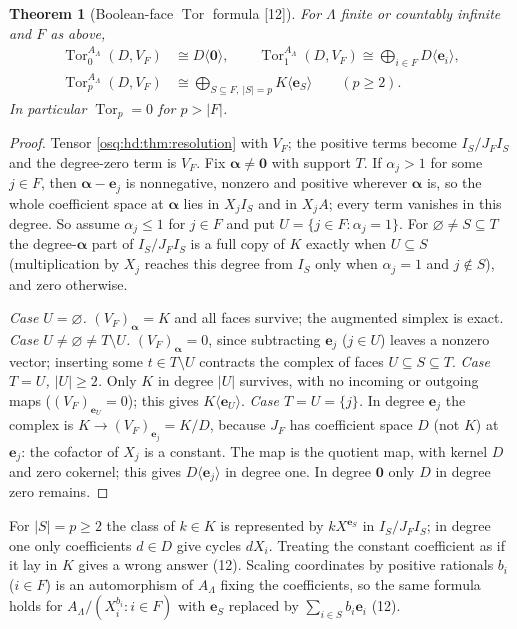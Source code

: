 \documentclass[11pt,letterpaper]{article}
\numberwithin{equation}{section}
\newtheorem{theorem}{Theorem}[section]
\theoremstyle{definition}
\theoremstyle{remark}
\theoremstyle{plain}
\newcommand{\Tor}{\operatorname{Tor}}
\newcommand{\src}[1]{\textup{\textsf{[#1]}}}
\begin{document}
\begin{theorem}[Boolean-face $\Tor$ formula \src{12}]\label{osq:hd:thm:boolean}
For $\Lambda$ finite or countably infinite and $F$ as above,
\begin{align*}
 \Tor_0^{A_\Lambda}(D,V_F)&\cong D\langle\mathbf 0\rangle,\qquad
 \Tor_1^{A_\Lambda}(D,V_F)\cong\bigoplus_{i\in F}D\langle\mathbf e_i\rangle,\\
 \Tor_p^{A_\Lambda}(D,V_F)&\cong\bigoplus_{S\subseteq F,\ |S|=p}K\langle\mathbf e_S\rangle\qquad(p\ge2).
\end{align*}
In particular $\Tor_p=0$ for $p>|F|$.
\end{theorem}
\begin{proof}
Tensor \cref{osq:hd:thm:resolution} with $V_F$; the positive terms become $I_S/J_FI_S$ and the degree-zero term is $V_F$.
Fix $\boldsymbol\alpha\ne\mathbf 0$ with support $T$. If $\alpha_j>1$ for some $j\in F$, then $\boldsymbol\alpha-\mathbf e_j$
is nonnegative, nonzero and positive wherever $\boldsymbol\alpha$ is, so the whole coefficient space at
$\boldsymbol\alpha$ lies in $X_jI_S$ and in $X_jA$; every term vanishes in this degree. So assume $\alpha_j\le1$ for $j\in F$
and put $U=\{j\in F:\alpha_j=1\}$. For $\varnothing\ne S\subseteq T$ the degree-$\boldsymbol\alpha$ part of $I_S/J_FI_S$ is
a full copy of $K$ exactly when $U\subseteq S$ (multiplication by $X_j$ reaches this degree from $I_S$ only when
$\alpha_j=1$ and $j\notin S$), and zero otherwise.

\emph{Case $U=\varnothing$.} $(V_F)_{\boldsymbol\alpha}=K$ and all faces survive; the augmented simplex is exact.
\emph{Case $U\ne\varnothing\ne T\setminus U$.} $(V_F)_{\boldsymbol\alpha}=0$, since subtracting $\mathbf e_j$ ($j\in U$)
leaves a nonzero vector; inserting some $t\in T\setminus U$ contracts the complex of faces $U\subseteq S\subseteq T$.
\emph{Case $T=U$, $|U|\ge2$.} Only $K$ in degree $|U|$ survives, with no incoming or outgoing maps
($(V_F)_{\mathbf e_U}=0$); this gives $K\langle\mathbf e_U\rangle$.
\emph{Case $T=U=\{j\}$.} In degree $\mathbf e_j$ the complex is $K\to(V_F)_{\mathbf e_j}=K/D$, because $J_F$ has
coefficient space $D$ (not $K$) at $\mathbf e_j$: the cofactor of $X_j$ is a constant. The map is the quotient map,
with kernel $D$ and zero cokernel; this gives $D\langle\mathbf e_j\rangle$ in degree one.
In degree $\mathbf 0$ only $D$ in degree zero remains.
\end{proof}

For $|S|=p\ge2$ the class of $k\in K$ is represented by $kX^{\mathbf e_S}$ in $I_S/J_FI_S$; in degree one only
coefficients $d\in D$ give cycles $dX_i$. Treating the constant coefficient as if it lay in $K$ gives a wrong
answer (12). Scaling coordinates by positive rationals $b_i$ ($i\in F$) is an automorphism of $A_\Lambda$ fixing the
coefficients, so the same formula holds for $A_\Lambda/(X_i^{b_i}:i\in F)$ with $\mathbf e_S$ replaced by
$\sum_{i\in S}b_i\mathbf e_i$ (12).
\end{document}
